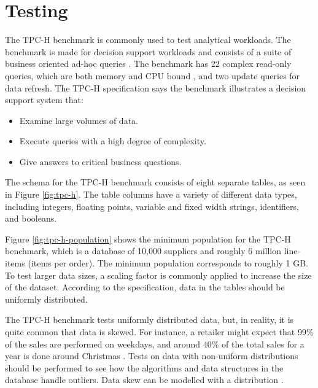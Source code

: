 \section{Testing}
\label{sec:Testing}
The TPC-H benchmark is commonly used to test analytical workloads. The benchmark is made for decision support workloads and consists of a suite of business oriented ad-hoc queries \cite{Transaction_Processing_Performance_Council_TPC2014-ux}. The benchmark has 22 complex read-only queries, which are both memory and CPU bound \cite{Boncz2005-wj}, and two update queries for data refresh. The TPC-H specification says the benchmark illustrates a decision support system that:
\begin{itemize}
  \item Examine large volumes of data.
  \item Execute queries with a high degree of complexity.
  \item Give answers to critical business questions.
\end{itemize}

The schema for the TPC-H benchmark consists of eight separate tables, as seen in Figure \ref{fig:tpc-h}. The table columns have a variety of different data types, including integers, floating points, variable and fixed width strings, identifiers, and booleans. 

Figure \ref{fig:tpc-h-population} shows the minimum population for the TPC-H benchmark, which is a database of 10,000 suppliers and roughly 6 million line-items (items per order). The minimum population corresponds to roughly 1 GB. To test larger data sizes, a scaling factor is commonly applied to increase the size of the dataset. According to the specification, data in the tables should be uniformly distributed.

The TPC-H benchmark tests uniformly distributed data, but, in reality, it is quite common that data is skewed. For instance, a retailer might expect that 99\% of the sales are performed on weekdays, and around 40\% of the total sales for a year is done around Christmas \cite{Raman2008-gi}. Tests on data with non-uniform distributions should be performed to see how the algorithms and data structures in the database handle outliers. Data skew can be modelled with a  distribution \cite{Holloway2008-rr}. 
